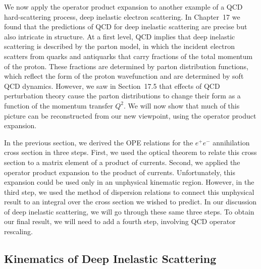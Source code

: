 We now apply the operator product expansion to another example of a QCD
hard-scattering process, deep inelastic electron scattering.  In Chapter~17 we
found that the predictions of QCD for deep inelastic scattering are precise
but also intricate in structure.  At a first level, QCD implies that deep
inelastic scattering is described by the parton model, in which the incident
electron scatters from quarks and antiquarks that carry fractions of the total
momentum of the proton.  These fractions are determined by parton
distribution functions, which reflect the form of the proton wavefunction and
are determined by soft QCD dynamics.  However, we saw in Section~17.5 that
effects of QCD perturbation theory cause the parton distributions to change
their form as a function of the momentum transfer $Q^2$.  We will now show
that much of this picture can be reconstructed from our new viewpoint, using
the operator product expansion.

In the previous section, we derived the OPE relations for the $e^{+}e^{-}$
annihilation cross section in three steps.  First, we used the optical theorem
to relate this cross section to a matrix element of a product of currents.
Second, we applied the operator product expansion to the product of currents.
Unfortunately, this expansion could be used only in an unphysical kinematic
region.  However, in the third step, we used the method of dispersion
relations to connect this unphysical result to an integral over the cross
section we wished to predict.  In our discussion of deep inelastic scattering,
we will go through these same three steps.  To obtain our final result, we
will need to add a fourth step, involving QCD operator rescaling.

\subsection{Kinematics of Deep Inelastic Scattering}

